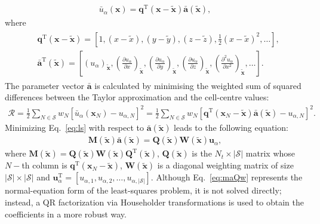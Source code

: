 \documentclass[sn-mathphys,Numbered]{sn-jnl}%
\newcommand{\bb}{\boldsymbol}
\begin{document}
\begin{eqnarray}
\bar{u}_\alpha(\bb{x}) = \mathbf{q}^{\mathrm{T}}(\bb{x}-\tilde{\bb{x}})\bar{\mathbf{a}}(\tilde{\bb{x}}),
\end{eqnarray}
%
where
%
\begin{eqnarray}\label{eq:qAnda}
\begin{split}
&\mathbf{q}^{\mathrm{T}}(\bb{x}-\tilde{\bb{x}}) = \left[1, (x-\tilde{x}), (y-\tilde{y}), (z-\tilde{z}), \frac{1}{2}(x-\tilde{x})^2, \dots \right],\\
& \bar{\mathbf{a}}^{\mathrm{T}}(\tilde{\bb{x}}) = \left[(u_\alpha)_{\tilde{\bb{x}}}, \left(\frac{\partial u_\alpha}{\partial x}\right)_{\tilde{\bb{x}}},
 \left(\frac{\partial u_\alpha}{\partial y}\right)_{\tilde{\bb{x}}},
 \left(\frac{\partial u_\alpha}{\partial z}\right)_{\tilde{\bb{x}}},
 \left(\frac{\partial^2 u_\alpha}{\partial x^2}\right)_{\tilde{\bb{x}}},
 \dots  \right].
\end{split}
\end{eqnarray}
%
The parameter vector $\bar{\mathbf{a}}$ is calculated by minimising the weighted sum of squared differences between the Taylor approximation and the cell-centre values:
%
\begin{eqnarray}\label{eq:ls}
\mathcal{R} = \frac{1}{2} \sum_{N \in \mathcal{S}} w_N \left [ \bar{u}_\alpha(\bb{x}_N) - u_{\alpha,N}\right]^2 =\frac{1}{2} \sum_{N \in \mathcal{S}} w_N \left [ \mathbf{q}^{\mathrm{T}}(\bb{x}_N-\tilde{\bb{x}})\bar{\mathbf{a}}(\tilde{\bb{x}}) - u_{\alpha,N}\right]^2.
\end{eqnarray}
%
Minimizing Eq.~\eqref{eq:ls} with respect to $\bar{\mathbf{a}}(\tilde{\boldsymbol{x}})$ leads to the following equation:
%
\begin{eqnarray}\label{eq:maQw}
\mathbf{{M}}(\tilde{\bb{x}}) \mathbf{\bar{a}}(\tilde{\bb{x}}) = \mathbf{{Q}}(\tilde{\bb{x}}) \mathbf{{W}}(\tilde{\bb{x}}) \mathbf{u}_\alpha,
\end{eqnarray}
%
where $\mathbf{M}(\tilde{\bb{x}})=\mathbf{Q}(\tilde{\bb{x}})\mathbf{W}(\tilde{\bb{x}})\mathbf{Q}^{\mathrm{T}}(\tilde{\bb{x}})$, $\mathbf{Q}(\tilde{\bb{x}})$ is the $N_t \times |\mathcal{S}|$ matrix whose $N-$th column is $\mathbf{q}^{\mathrm{T}}(\bb{x}_N-\tilde{\bb{x}})$, $\mathbf{W}(\tilde{\bb{x}})$ is a diagonal weighting matrix of size $|\mathcal{S}| \times |\mathcal{S}|$ and $\mathbf{u}^\text{T}_\alpha=\left[u_{\alpha,1}, u_{\alpha,2},\dots,u_{\alpha,|\mathcal{S}|} \right] $.
Although Eq.~\eqref{eq:maQw} represents the normal-equation form of the least-squares problem, it is not solved directly; instead, a QR factorization via Householder transformations \cite{strang2012} is used to obtain the coefficients in a more robust way.
\end{document}
